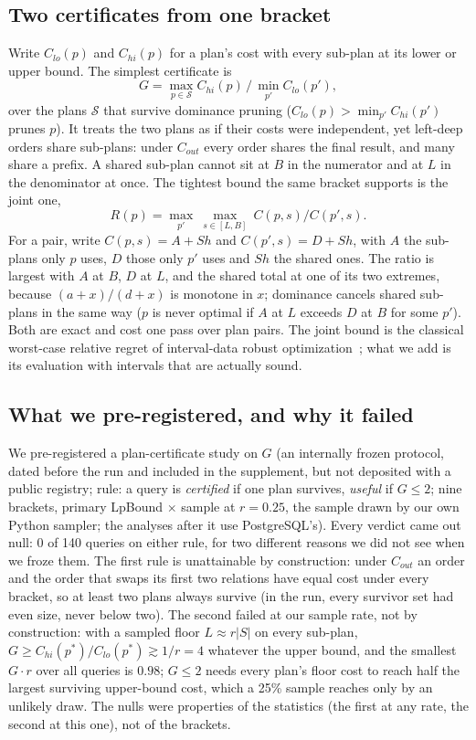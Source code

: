 \documentclass[sigconf, nonacm]{acmart}
\begin{document}
\subsection{Two certificates from one bracket}
Write $C_{lo}(p)$ and $C_{hi}(p)$ for a plan's cost with every sub-plan at its
lower or upper bound. The simplest certificate is
\begin{equation}
G = \max_{p\in\mathcal{S}} C_{hi}(p) \,/\, \min_{p'} C_{lo}(p'),
\end{equation}
over the plans $\mathcal{S}$ that survive dominance pruning
($C_{lo}(p)>\min_{p'}C_{hi}(p')$ prunes $p$). It treats the two plans as if
their costs were independent, yet left-deep orders share sub-plans: under
$C_{out}$ every order shares the final result, and many share a prefix. A shared
sub-plan cannot sit at $B$ in the numerator and at $L$ in the denominator at
once. The tightest bound the same bracket supports is the joint one,
\begin{equation}
R(p) = \max_{p'}\ \max_{s\in[L,B]}\ C(p,s)/C(p',s).
\end{equation}
For a pair, write $C(p,s)=A+\mathit{Sh}$ and $C(p',s)=D+\mathit{Sh}$, with $A$
the sub-plans only $p$ uses, $D$ those only $p'$ uses and $\mathit{Sh}$ the
shared ones. The ratio is largest
with $A$ at $B$, $D$ at $L$, and the shared total at one of its two extremes,
because $(a+x)/(d+x)$ is monotone in $x$; dominance cancels shared sub-plans in
the same way ($p$ is never optimal if $A$ at $L$ exceeds $D$ at $B$ for some
$p'$). Both are exact and cost one pass over plan pairs. The joint bound is the
classical worst-case relative regret of interval-data robust
optimization~\cite{kouvelis1997robust,averbakh2005relative}; what we add is
its evaluation with intervals that are actually sound.

\subsection{What we pre-registered, and why it failed}
We pre-registered a plan-certificate study on $G$ (an internally frozen
protocol, dated before the run and included in the supplement, but not
deposited with a public registry; rule: a query is
\emph{certified} if one plan survives, \emph{useful} if $G\le2$; nine brackets,
primary LpBound $\times$ sample at $r{=}0.25$, the sample drawn by our own
Python sampler; the analyses after it use PostgreSQL's). Every verdict came
out null:
0 of 140 queries on either rule, for two different reasons we did not see when
we froze them. The first rule is unattainable by construction: under $C_{out}$
an order and the order that swaps its first two relations have equal cost under
every bracket, so at least two plans always survive (in the run, every survivor
set had even size, never below two). The second failed at our sample rate, not
by construction: with a sampled floor $L\approx r|S|$ on every sub-plan,
$G\ge C_{hi}(p^*)/C_{lo}(p^*)\gtrsim 1/r=4$ whatever the upper bound, and the
smallest $G\cdot r$ over all queries is $0.98$; $G\le2$ needs every plan's
floor cost to reach half the largest surviving upper-bound cost, which a 25\% sample
reaches only by an unlikely draw. The nulls were properties of the statistics
(the first at any rate, the second at this one), not of the brackets.
\end{document}
